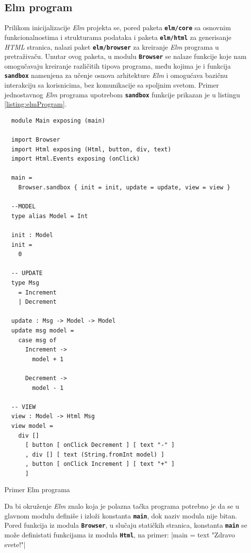 \documentclass[12pt,oneside]{memoir}
\begin{document}
\subsection{Elm program}
Prilikom inicijalizacije \emph{Elm} projekta se, pored paketa \texttt{\textbf{elm/core}} sa
osnovnim funkcionalnostima i strukturama podataka i paketa \texttt{\textbf{elm/html}} za
generisanje \emph{HTML} stranica, nalazi paket \texttt{\textbf{elm/browser}} za kreiranje \emph{Elm}
programa u pretraživaču. Unutar ovog paketa, u modulu \texttt{\textbf{Browser}} se nalaze
funkcije koje nam omogučavaju kreiranje različitih tipova programa, među kojima je i
funkcija \texttt{\textbf{sandbox}} namenjena za učenje osnova arhitekture \emph{Elm} i
omogućava bazičnu interakciju sa korisnicima, bez komunikacije sa spoljnim svetom.
Primer jednostavnog \emph{Elm} programa upotrebom \texttt{\textbf{sandbox}} funkcije prikazan
je u listingu \ref{listing:elmProgram}.
\begin{listing}[h!]
\begin{verbatim}
  module Main exposing (main)

  import Browser
  import Html exposing (Html, button, div, text)
  import Html.Events exposing (onClick)
  
  main =
    Browser.sandbox { init = init, update = update, view = view }

  --MODEL
  type alias Model = Int
  
  init : Model
  init =
    0
  
  -- UPDATE
  type Msg
    = Increment
    | Decrement
  
  update : Msg -> Model -> Model
  update msg model =
    case msg of
      Increment ->
        model + 1
  
      Decrement ->
        model - 1
  
  -- VIEW
  view : Model -> Html Msg
  view model =
    div []
      [ button [ onClick Decrement ] [ text "-" ]
      , div [] [ text (String.fromInt model) ]
      , button [ onClick Increment ] [ text "+" ]
      ]
\end{verbatim}
\caption{Primer Elm programa}
\label{listing:elmProgram}
\end{listing}

Da bi okruženje \emph{Elm} znalo koja je polazna tačka programa potrebno je da se u glavnom
modulu definiše i izloži konstanta \textbf{\texttt{main}}, dok naziv modula nije bitan.
Pored funkcija iz modula \texttt{\textbf{Browser}}, u slučaju statičkih stranica, konstanta 
\textbf{\texttt{main}} se može definistati funkcijama iz modula \texttt{\textbf{Html}},
na primer: |main = text "Zdravo svete!"|
\end{document}
